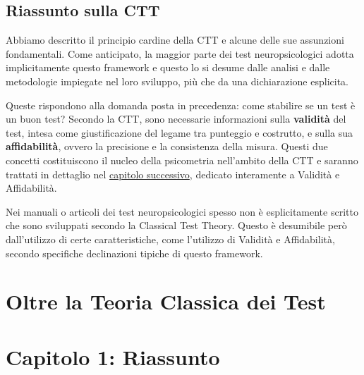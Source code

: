\documentclass[
  italian,
  letterpaper,
  paper=A4,
  headinclude=on,
  footinclude=on,
  12pt]{scrbook}
\begin{document}
\subsection{\texorpdfstring{Riassunto sulla CTT
}{Riassunto sulla CTT }}\label{riassunto-sulla-ctt}

Abbiamo descritto il principio cardine della CTT e alcune delle sue
assunzioni fondamentali. Come anticipato, la maggior parte dei test
neuropsicologici adotta implicitamente questo framework e questo lo si
desume dalle analisi e dalle metodologie impiegate nel loro sviluppo,
più che da una dichiarazione esplicita.

Queste rispondono alla domanda posta in precedenza: come stabilire se un
test è un buon test? Secondo la CTT, sono necessarie informazioni sulla
\textbf{validità} del test, intesa come giustificazione del legame tra
punteggio e costrutto, e sulla sua \textbf{affidabilità}, ovvero la
precisione e la consistenza della misura. Questi due concetti
costituiscono il nucleo della psicometria nell'ambito della CTT e
saranno trattati in dettaglio nel
\hyperref[validita-e-affidabilita]{capitolo successivo}, dedicato
interamente a Validità e Affidabilità.

\begin{tcolorbox}[enhanced jigsaw, left=2mm, colbacktitle=quarto-callout-tip-color!10!white, bottomrule=.15mm, opacityback=0, coltitle=black, colframe=quarto-callout-tip-color-frame, opacitybacktitle=0.6, leftrule=.75mm, colback=white, toprule=.15mm, title=\textcolor{quarto-callout-tip-color}{\faLightbulb}\hspace{0.5em}{Nota}, titlerule=0mm, arc=.35mm, breakable, rightrule=.15mm, bottomtitle=1mm, toptitle=1mm]

Nei manuali o articoli dei test neuropsicologici spesso non è
esplicitamente scritto che sono sviluppati secondo la Classical Test
Theory. Questo è desumibile però dall'utilizzo di certe caratteristiche,
come l'utilizzo di Validità e Affidabilità, secondo specifiche
declinazioni tipiche di questo framework.

\end{tcolorbox}

\section{Oltre la Teoria Classica dei
Test}\label{oltre-la-teoria-classica-dei-test}

\section{Capitolo 1: Riassunto}\label{capitolo-1-riassunto}
\end{document}
